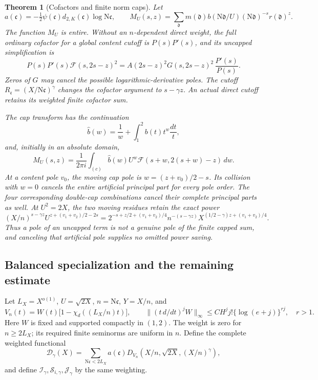 \documentclass[11pt]{article}
\newcommand{\mathscr}{\mathcal}
\numberwithin{equation}{section}
\newcommand{\F}{\mathcal F}
\newcommand{\N}{\mathrm N}
\newtheorem{theorem}{Theorem}[section]
\begin{document}
\begin{theorem}[Cofactors and finite norm caps]\label{res:caps-main}
Let
\[
 a(\mathfrak c)=-\tfrac12\psi(\mathfrak c)
 d_{2,K}(\mathfrak c)\log\N\mathfrak c,\qquad
 M_U(s,z)=\sum_{\mathfrak d}m(\mathfrak d)b(\N\mathfrak d/U)
 (\N\mathfrak d)^{-s}r(\mathfrak d)^z.
\]
The function \(M_U\) is entire. Without an \(n\)-dependent direct
weight, the full ordinary cofactor for a global content cutoff is
\(P(s)P'(s)\), and its uncapped simplification is
\[
 P(s)P'(s)\F(s,2s-z)^2
 =A(2s-z)^2G(s,2s-z)^2\,\frac{P'(s)}{P(s)}.
\]
Zeros of \(G\) may cancel the possible logarithmic-derivative poles.
The cutoff \(R_{\mathfrak c}=(X/\N\mathfrak c)^\gamma\) changes
the cofactor argument to \(s-\gamma z\).
An actual direct cutoff retains its weighted finite cofactor sum.

The cap transform has the continuation
\[
 \widehat b(w)=\frac1w+\int_1^2b(t)t^w\frac{dt}{t},
\]
and, initially in an absolute domain,
\[
 M_U(s,z)=\frac1{2\pi i}\int_{(c)}
 \widehat b(w)U^w\F(s+w,2(s+w)-z)\,dw.
\]
At a content pole \(v_0\), the moving cap pole is
\(w=(z+v_0)/2-s\). Its collision with \(w=0\) cancels the entire
artificial principal part for every pole order. The four corresponding
double-cap combinations cancel their complete principal parts as
well. At \(U^2=2X\), the two moving residues retain the exact power
\[
 (X/n)^{s-\gamma z}U^{z+(v_1+v_2)/2-2s}
 =
 2^{-s+z/2+(v_1+v_2)/4}
 n^{-(s-\gamma z)}
 X^{(1/2-\gamma)z+(v_1+v_2)/4}.
\]
Thus a pole of an uncapped term is not a genuine pole of the finite
capped sum, and canceling that artificial pole supplies no omitted
power saving.
\end{theorem}

\subsection{Balanced specialization and the remaining estimate}

Let \(L_X=X^{o(1)}\), \(U=\sqrt{2X}\), \(n=\N\mathfrak c\),
\(Y=X/n\), and
\[
 V_n(t)=W(t)\bigl[1-\chi_d((L_X/n)t)\bigr],\qquad
 \|(t\,d/dt)^jW\|_\infty
 \le CH^j j!\{\log(e+j)\}^{rj},\quad r>1.
\]
Here \(W\) is fixed and supported compactly in \((1,2)\).
The weight is zero for \(n\ge2L_X\); its required finite seminorms
are uniform in \(n\). Define the complete weighted functional
\[
 \mathscr D_\gamma(X)=
 \sum_{\N\mathfrak c<2L_X}a(\mathfrak c)
 D_{V_n}(X/n,\sqrt{2X},(X/n)^\gamma),
\]
and define \(\mathscr I_\gamma,\mathscr S_{i,\gamma},
\mathscr J_\gamma\) by the same weighting.
\end{document}
